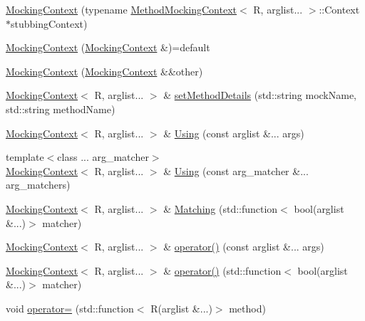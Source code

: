 \begin{DoxyCompactItemize}
\item 
\mbox{\hyperlink{classfakeit_1_1MockingContext_a5700542bcb10d5ff297e389f9ea988e8}{Mocking\+Context}} (typename \mbox{\hyperlink{classfakeit_1_1MethodMockingContext}{Method\+Mocking\+Context}}$<$ R, arglist... $>$\+::Context $\ast$stubbing\+Context)
\item 
\mbox{\hyperlink{classfakeit_1_1MockingContext_aa4fec015b3088d8d98449f6a90525e0d}{Mocking\+Context}} (\mbox{\hyperlink{classfakeit_1_1MockingContext}{Mocking\+Context}} \&)=default
\item 
\mbox{\hyperlink{classfakeit_1_1MockingContext_a4611ccb2f40b25362c40316ec87c0da5}{Mocking\+Context}} (\mbox{\hyperlink{classfakeit_1_1MockingContext}{Mocking\+Context}} \&\&other)
\item 
\mbox{\hyperlink{classfakeit_1_1MockingContext}{Mocking\+Context}}$<$ R, arglist... $>$ \& \mbox{\hyperlink{classfakeit_1_1MockingContext_a07958a59915dcc84633818a9644e1921}{set\+Method\+Details}} (std\+::string mock\+Name, std\+::string method\+Name)
\item 
\mbox{\hyperlink{classfakeit_1_1MockingContext}{Mocking\+Context}}$<$ R, arglist... $>$ \& \mbox{\hyperlink{classfakeit_1_1MockingContext_ade706bb68e9ffb128fad353a3b15758b}{Using}} (const arglist \&... args)
\item 
{\footnotesize template$<$class ... arg\+\_\+matcher$>$ }\\\mbox{\hyperlink{classfakeit_1_1MockingContext}{Mocking\+Context}}$<$ R, arglist... $>$ \& \mbox{\hyperlink{classfakeit_1_1MockingContext_acb9bd9b011ac2ad88c8d08eebfa101ac}{Using}} (const arg\+\_\+matcher \&... arg\+\_\+matchers)
\item 
\mbox{\hyperlink{classfakeit_1_1MockingContext}{Mocking\+Context}}$<$ R, arglist... $>$ \& \mbox{\hyperlink{classfakeit_1_1MockingContext_a631dd9877017e082b2e1191b02f4c17a}{Matching}} (std\+::function$<$ bool(arglist \&...)$>$ matcher)
\item 
\mbox{\hyperlink{classfakeit_1_1MockingContext}{Mocking\+Context}}$<$ R, arglist... $>$ \& \mbox{\hyperlink{classfakeit_1_1MockingContext_a70a55886680449fa36e8f5869af93389}{operator()}} (const arglist \&... args)
\item 
\mbox{\hyperlink{classfakeit_1_1MockingContext}{Mocking\+Context}}$<$ R, arglist... $>$ \& \mbox{\hyperlink{classfakeit_1_1MockingContext_aff3a6b6107f5bc4e028e75bf9b55f313}{operator()}} (std\+::function$<$ bool(arglist \&...)$>$ matcher)
\item 
void \mbox{\hyperlink{classfakeit_1_1MockingContext_aadefb2bd6c1dee1f3aa8902277dd3fc2}{operator=}} (std\+::function$<$ R(arglist \&...)$>$ method)

\end{DoxyCompactItemize}
